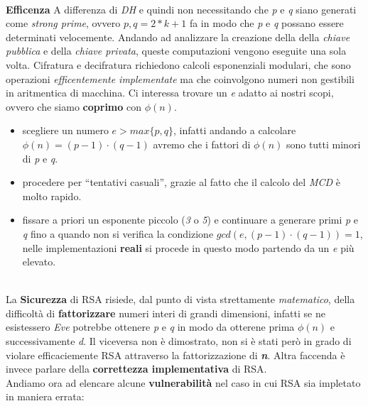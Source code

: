 \\ \newline
\textbf{Efficenza}
\newline
A differenza di \textit{DH} e quindi non necessitando che \textit{p} e \textit{q} siano generati come \textit{strong prime}, ovvero $p,q = 2*k + 1$ fa in modo che \textit{p} e \textit{q} possano essere determinati velocemente. Andando ad analizzare la creazione della della \textit{chiave pubblica} e della \textit{chiave privata}, queste computazioni vengono eseguite una sola volta. Cifratura e decifratura richiedono calcoli esponenziali modulari, che sono operazioni \textit{efficentemente implementate} ma che coinvolgono numeri non gestibili in aritmentica di macchina. Ci interessa trovare un \textit{e} adatto ai nostri scopi, ovvero che siamo \textbf{coprimo} con $\phi(n)$.
\begin{itemize}
    \item scegliere un numero $e > max\{p, q\}$, infatti andando a calcolare $\phi(n) = (p - 1) \cdot (q - 1)$ avremo che i fattori di $\phi(n)$ sono tutti minori di \textit{p} e \textit{q}. 
    \item procedere per ``tentativi casuali'', grazie al fatto che il calcolo del \textit{MCD} è molto rapido.
    \item fissare a priori un esponente piccolo  (\textit{3} o \textit{5}) e continuare a generare primi \textit{p} e \textit{q} fino a quando non si verifica la condizione $gcd(e, (p - 1) \cdot (q - 1)) = 1$, nelle implementazioni \textbf{reali} si procede in questo modo partendo da un \textit{e} più elevato.
\end{itemize}
\   \\
La \textbf{Sicurezza} di RSA risiede, dal punto di vista strettamente \textit{matematico}, della difficoltà di \textbf{fattorizzare} numeri interi di grandi dimensioni, infatti se ne esistessero \textit{Eve} potrebbe ottenere \textit{p} e \textit{q} in modo da otterene prima $\phi(n)$ e successivamente \textit{d}. Il viceversa non è dimostrato, non si è stati però in grado di violare efficaciemente RSA attraverso la fattorizzazione di \textbf{\textit{n}}. Altra faccenda è invece parlare della \textbf{correttezza implementativa} di RSA. \\
Andiamo ora ad elencare alcune \textbf{vulnerabilità} nel caso in cui RSA sia impletato in maniera errata:

